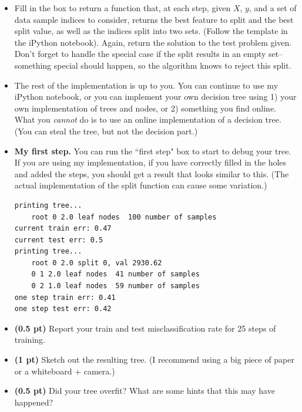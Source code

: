 \documentclass{article}
\newcommand{\showpoints}[1]{\textbf{(#1)}}
\begin{document}
\begin{enumerate}
\begin{itemize}
\item Fill in the box to return  a function that, at each step, given $X$, $y$, and a set of data sample indices to consider, returns the best feature to split and the best split value, as well as the indices split into two sets. (Follow the template in the iPython notebook). Again, return the solution to the test problem given.  Don't forget to handle the special case if the split results in an empty set--something special should happen, so the algorithm knows to reject this split.


\item The rest of the implementation is up to you. You can continue to use my iPython notebook, or you can implement your own decision tree using 1) your own implementation of trees and nodes, or 2) something you find online. What you \emph{cannot} do is to use an online implementation of a decision tree. (You can steal the tree, but not the decision part.) 


\item \textbf{My first step.} You can run the ``first step" box to start to debug your tree.
If you are using my implementation, if you have correctly filled in the holes and added the steps, you should get a result that looks similar to this. (The actual implementation of the split function can cause some variation.)

\begin{verbatim}
printing tree...
    root 0 2.0 leaf nodes  100 number of samples
current train err: 0.47
current test err: 0.5
printing tree...
    root 0 2.0 split 0, val 2930.62
    0 1 2.0 leaf nodes  41 number of samples
    0 2 1.0 leaf nodes  59 number of samples
one step train err: 0.41
one step test err: 0.42
\end{verbatim}

\item \showpoints{0.5 pt} Report your train and test misclassification rate for 25 steps of training. 


\item \showpoints{1 pt} Sketch out the resulting tree. (I recommend using a big piece of paper or a whiteboard + camera.) 


\item  \showpoints{0.5 pt}  Did your tree overfit? What are some hints that this may have happened?


\end{itemize}





























\end{enumerate}
\end{document}
